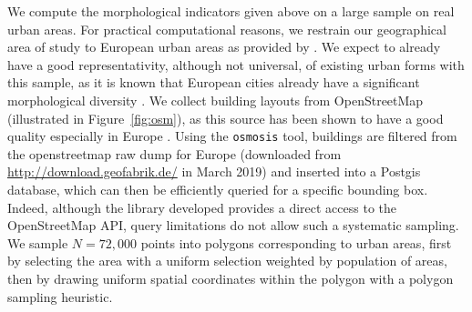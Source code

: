 \documentclass[letterpaper]{article}
\begin{document}
We compute the morphological indicators given above on a large sample on real urban areas. For practical computational reasons, we restrain our geographical area of study to European urban areas as provided by \cite{}. We expect to already have a good representativity, although not universal, of existing urban forms with this sample, as it is known that European cities already have a significant morphological diversity \citep{le2015forme}. We collect building layouts from OpenStreetMap (illustrated in Figure~\ref{fig:osm}), as this source has been shown to have a good quality especially in Europe \citep{mooney2010towards}. Using the \texttt{osmosis} tool, buildings are filtered from the openstreetmap raw dump for Europe (downloaded from \url{http://download.geofabrik.de/} in March 2019) and inserted into a Postgis database, which can then be efficiently queried for a specific bounding box. Indeed, although the library developed provides a direct access to the OpenStreetMap API, query limitations do not allow such a systematic sampling.
We sample $N=72,000$ points into polygons corresponding to urban areas, first by selecting the area with a uniform selection weighted by population of areas, then by drawing uniform spatial coordinates within the polygon with a polygon sampling heuristic. %

\end{document}
